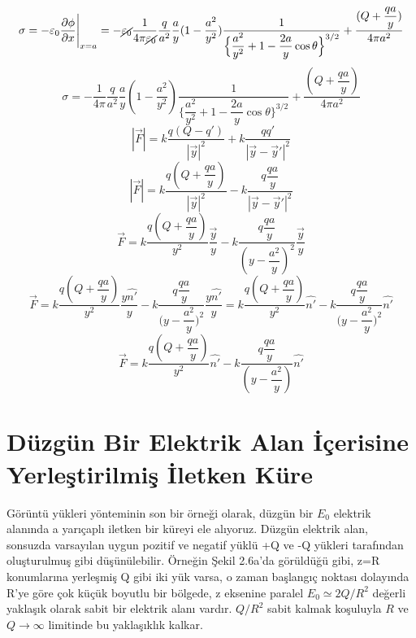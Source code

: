 \begin{theorem}
\[ \sigma = - \varepsilon_{0} \dfrac{\partial \phi}{\partial x} \Bigg|_{x=a} = - \cancel{\varepsilon_{0}}  \dfrac{1}{4 \pi \cancel{\varepsilon_{0}}}  \dfrac{q}{a^{2}}  \dfrac{a}{y}  ( 1 - \dfrac{a^{2}}{y^{2}}) \dfrac{1}{\Big\{ \dfrac{a^{2}}{y^{2}} + 1 - \dfrac{2a}{y} \cos \theta \Big\}^{3/2}} + \dfrac{(Q + \dfrac{qa}{y}) }{4 \pi a^{2}}  \]
\[ \sigma =  -  \dfrac{1}{4 \pi }  \dfrac{q}{a^{2}}  \dfrac{a}{y}  ( 1 - \dfrac{a^{2}}{y^{2}}) \dfrac{1}{\Big\{ \dfrac{a^{2}}{y^{2}} + 1 - \dfrac{2a}{y} \cos \theta \Big\}^{3/2}} + \dfrac{(Q + \dfrac{qa}{y}) }{4 \pi a^{2}}  \]
\[ |\Vec{F}| = k \dfrac{q(Q-q')}{|\Vec{y}|^{2}} + k \dfrac{q q'}{|\Vec{y} - \Vec{y}'|^{2}} \]
\[ |\Vec{F}| = k \dfrac{q(Q + \dfrac{qa}{y})}{|\Vec{y}|^{2}} - k \dfrac{q \dfrac{qa}{y}}{|\Vec{y} - \Vec{y}'|^{2}}  \]
\[ \Vec{F} = k \dfrac{q(Q + \dfrac{qa}{y})}{y^{2}} \dfrac{\Vec{y}}{y} - k \dfrac{q \dfrac{qa}{y}}{(y - \dfrac{a^{2}}{y})^{2}} \dfrac{\Vec{y}}{y}  \]
\[ \Vec{F} = k \dfrac{q(Q + \dfrac{qa}{y})}{y^{2}} \dfrac{y \hat{n'}}{y} - k \dfrac{q \dfrac{qa}{y}}{\bigg(y - \dfrac{a^{2}}{y}\bigg)^{2}} \dfrac{y \hat{n'}}{y} = k \dfrac{q(Q + \dfrac{qa}{y})}{y^{2}} \hat{n'} - k \dfrac{q \dfrac{qa}{y}}{\bigg(y - \dfrac{a^{2}}{y} \bigg)^{2}}\hat{n'}  \]
\[ \Vec{F} = k \dfrac{q(Q + \dfrac{qa}{y})}{y^{2}} \hat{n'} - k \dfrac{q \dfrac{qa}{y}}{(y - \dfrac{a^{2}}{y})}\hat{n'} \]
\end{theorem}

\section{Düzgün Bir Elektrik Alan İçerisine Yerleştirilmiş İletken Küre}

Görüntü yükleri yönteminin son bir örneği olarak, düzgün bir $E_{0}$ elektrik alanında a yarıçaplı iletken bir küreyi ele alıyoruz. Düzgün elektrik alan, sonsuzda varsayılan uygun pozitif ve negatif yüklü +Q ve -Q yükleri tarafından oluşturulmuş gibi düşünülebilir. Örneğin Şekil 2.6a'da görüldüğü gibi, z=R konumlarına yerleşmiş Q gibi iki yük varsa, o zaman başlangıç noktası dolayında R'ye göre çok küçük boyutlu bir bölgede, z eksenine paralel $E_{0} \simeq 2Q/R^{2} $ değerli yaklaşık olarak sabit bir elektrik alanı vardır. $Q/R^{2}$ sabit kalmak koşuluyla $R$ ve $Q \rightarrow \infty $ limitinde bu yaklaşıklık kalkar.  

